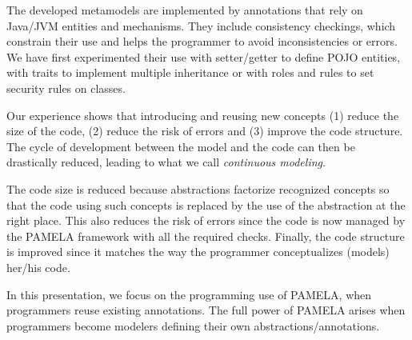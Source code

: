 
The developed metamodels are implemented by annotations that rely on Java/JVM entities and mechanisms. They include consistency checkings, which constrain their use and helps the programmer to avoid inconsistencies or errors. We have first experimented their use with setter/getter to define POJO entities, with traits to implement multiple inheritance or with roles and rules to set security rules on classes.

Our experience shows that introducing and reusing new concepts (1) reduce the size of the code, (2) reduce the risk of errors and (3) improve the code structure. The cycle of development between the model and the code can then be drastically reduced, leading to what we call \emph{continuous modeling}.

The code size is reduced because abstractions factorize recognized concepts so that the code using such concepts is replaced by the use of the abstraction at the right place. This also reduces the risk of errors since the code is now managed by the PAMELA framework with all the required checks. Finally, the code structure is improved since it matches the way the programmer conceptualizes (models) her/his code.

In this presentation, we focus on the programming use of PAMELA, when programmers reuse existing annotations. The full power of PAMELA arises when programmers become modelers defining their own abstractions/annotations.

